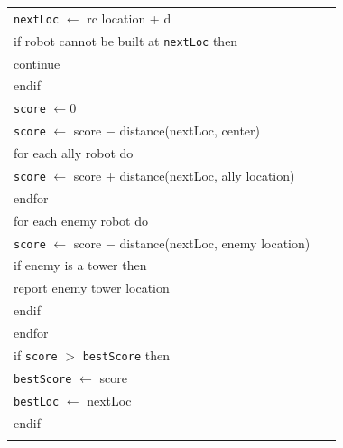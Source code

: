 \documentclass{article}
\newenvironment{pseudobox}
{
\centering
\begin{longtable}{|p{0.94\linewidth}|}
\hline
}
{
\\ \hline
\end{longtable}
\vspace{0.05cm}
}
\begin{document}
\begin{enumerate}[label=\alph*.]
\begin{pseudobox}
\hspace*{3em}\texttt{nextLoc} $\leftarrow$ rc location + d \\

\hspace*{3em}if robot cannot be built at \texttt{nextLoc} then \\
\hspace*{4.5em}continue \\
\hspace*{3em}endif \\

\hspace*{3em}\texttt{score} $\leftarrow 0$ \\

\hspace*{3em}\texttt{score} $\leftarrow$ score $-$ distance(nextLoc, center) \\

\hspace*{3em}for each ally robot do \\
\hspace*{4.5em}\texttt{score} $\leftarrow$ score + distance(nextLoc, ally location) \\
\hspace*{3em}endfor \\

\hspace*{3em}for each enemy robot do \\

\hspace*{4.5em}\texttt{score} $\leftarrow$ score $-$ distance(nextLoc, enemy location) \\

\hspace*{4.5em}if enemy is a tower then \\
\hspace*{6em}report enemy tower location \\
\hspace*{4.5em}endif \\

\hspace*{3em}endfor \\

\hspace*{3em}if \texttt{score} $>$ \texttt{bestScore} then \\
\hspace*{4.5em}\texttt{bestScore} $\leftarrow$ score \\
\hspace*{4.5em}\texttt{bestLoc} $\leftarrow$ nextLoc \\
\hspace*{3em}endif \\


\end{pseudobox}
\end{enumerate}
\end{document}
